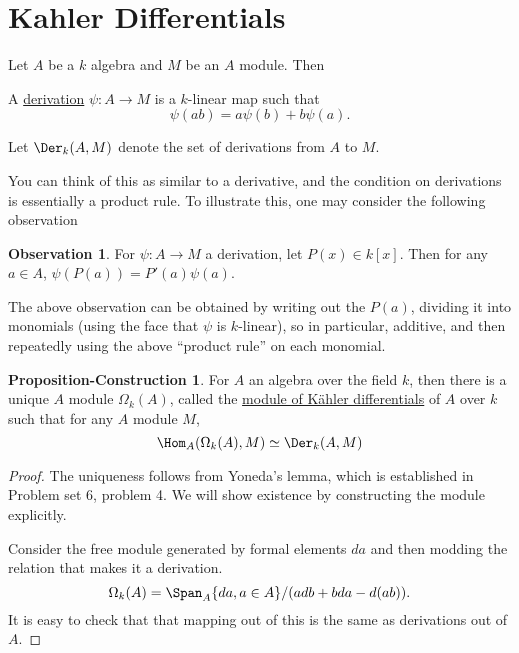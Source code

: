 \documentclass[12 pt]{article}
\theoremstyle{definition}
\newtheorem{propconstr}[theorem]{Proposition-Construction}
\newtheorem{obs}[theorem]{Observation}
\begin{document}
\section{Kahler Differentials}

Let $A$ be a $k$ algebra and $M$ be an $A$ module. Then
\begin{definition} A \underline{derivation} $\psi:A \to M$ is a $k$-linear map such that
\[\psi(ab)=a\psi(b)+b\psi(a).\]

Let $\Der_k(A,M)$ denote the set of derivations from $A$ to $M$.
\end{definition}

You can think of this as similar to a derivative, and the condition on derivations is essentially a product rule. To illustrate this, one may consider the following observation

\begin{obs} For $\psi:A \to M$ a derivation, let $P(x) \in k[x]$. Then for any $a \in A$, $\psi(P(a))=P'(a)\psi(a)$.
\end{obs}

The above observation can be obtained by writing out the $P(a)$, dividing it into monomials (using the face that $\psi$ is $k$-linear), so in particular, additive, and then repeatedly using the above ``product rule'' on each monomial.

\begin{propconstr} For $A$ an algebra over the field $k$, then there is a unique $A$ module $\Omega_k(A)$, called the \underline{module of K\"{a}hler differentials} of $A$ over $k$ such that for any $A$ module $M$,
\[\Hom_A(\Omega_k(A), M) \simeq \Der_k(A,M)\]
\label{kahlerdef}
\end{propconstr}
\begin{proof}
The uniqueness follows from Yoneda's lemma, which is established in Problem set 6, problem 4. We will show existence by constructing the module explicitly.

Consider the free module generated by formal elements $da$ and then modding the relation that makes it a derivation.
\[\Omega_k(A)=\Span_A\{da,a \in A\}/(adb+bda-d(ab)).\]
It is easy to check that that mapping out of this is the same as derivations out of $A$.
\end{proof}
\end{document}
